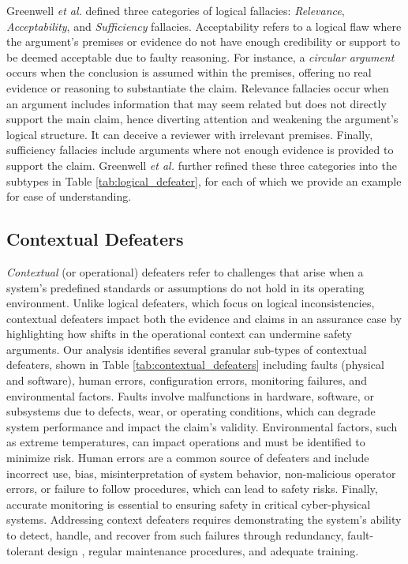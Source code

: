 Greenwell \MakeLowercase{\textit{et al.}} \cite{greenwell2006taxonomy} defined three categories of logical fallacies: \emph{Relevance}, \emph{Acceptability},  and \emph{Sufficiency} fallacies. Acceptability refers to a logical flaw where the argument's premises or evidence do not have enough credibility or support to be deemed acceptable due to faulty reasoning. For instance, a \emph{circular argument} occurs when the conclusion is assumed within the premises, offering no real evidence or reasoning to substantiate the claim. Relevance fallacies occur when an argument includes information that may seem related but does not directly support the main claim, hence diverting attention and weakening the argument's logical structure. It can deceive a reviewer with irrelevant premises. Finally, sufficiency fallacies include arguments where not enough evidence is provided to support the claim. Greenwell \MakeLowercase{\textit{et al.}} \cite{greenwell2006taxonomy} further refined these three categories into the subtypes in Table \ref{tab:logical_defeater}, for each of which we provide an example for ease of understanding.

\subsection{Contextual Defeaters}

\emph{Contextual} (or operational) defeaters refer to challenges that arise when a system's predefined standards or assumptions do not hold in its operating environment. Unlike logical defeaters, which focus on logical inconsistencies, contextual defeaters impact both the evidence and claims in an assurance case by highlighting how shifts in the operational context can undermine safety arguments. Our analysis identifies several granular sub-types of contextual defeaters, shown in Table \ref{tab:contextual_defeaters} including faults (physical and software), human errors, configuration errors, monitoring failures, and environmental factors. Faults involve malfunctions in hardware, software, or subsystems due to defects, wear, or operating conditions, which can degrade system performance and impact the claim's validity. Environmental factors, such as extreme temperatures, can impact operations and must be identified to minimize risk. Human errors are a common source of defeaters and include incorrect use, bias, misinterpretation of system behavior, non-malicious operator errors, or failure to follow procedures, which can lead to safety risks. Finally, accurate monitoring is essential to ensuring safety in critical cyber-physical systems. Addressing context defeaters requires demonstrating the system's ability to detect, handle, and recover from such failures through redundancy, fault-tolerant design \cite{dubrova2013fault}, regular maintenance procedures, and adequate training.


